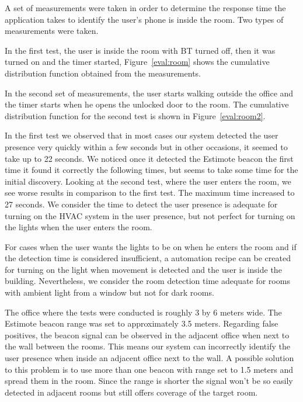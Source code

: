 A set of measurements were taken in order to determine the response time the application takes to identify the user's phone is inside the room. Two types of measurements were taken.

In the first test, the user is inside the room with \ac{BT} turned off, then it was turned on and the timer started, Figure~\ref{eval:room} shows the cumulative distribution function obtained from the measurements. 

In the second set of measurements, the user starts walking outside the office and the timer starts when he opens the unlocked door to the room. The cumulative distribution function for the second test is shown in Figure~\ref{eval:room2}.

In the first test we observed that in most cases our system detected the user presence very quickly within a few seconds but in other occasions, it seemed to take up to 22 seconds. We noticed once it detected the Estimote beacon the first time it found it correctly the following times, but seems to take some time for the initial discovery. Looking at the second test, where the user enters the room, we see worse results in comparison to the first test. The maximum time increased to 27 seconds. We consider the time to detect the user presence is adequate for turning on the \ac{HVAC} system in the user presence, but not perfect for turning on the lights when the user enters the room.

For cases when the user wants the lights to be on when he enters the room and if the detection time is considered insufficient, a automation recipe can be created for turning on the light when movement is detected and the user is inside the building. Nevertheless, we consider the room detection time adequate for rooms with ambient light from a window but not for dark rooms.

The office where the tests were conducted is roughly 3 by 6 meters wide. The Estimote beacon range was set to approximately 3.5 meters. Regarding false positives, the beacon signal can be observed in the adjacent office when next to the wall between the rooms. This means our system can incorrectly identify the user presence when inside an adjacent office next to the wall. A possible solution to this problem is to use more than one beacon with range set to 1.5 meters and spread them in the room. Since the range is shorter the signal won't be so easily detected in adjacent rooms but still offers coverage of the target room.


